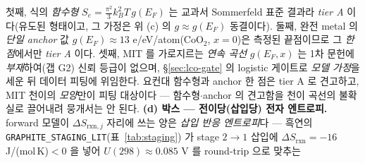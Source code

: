 \documentclass[11pt,a4paper]{article}
\newcommand{\rxn}{\mathrm{rxn}}
\newcommand{\code}[1]{\texttt{#1}}
\begin{document}
첫째, 식의 \emph{함수형} $S_e=\tfrac{\pi^2}{3}k_B^2T\,g(E_F)$ 는 교과서 Sommerfeld 표준 결과라 \emph{tier A} 이다(유도된
형태이고, 그 가정은 위 (c) 의 $g\!\approx\!g(E_F)$ 동결이다). 둘째, 완전 metal 의 \emph{단일 anchor} 값
$g(E_F)\!\approx\!13$ e/eV/atom($\mathrm{CoO_2}$, $x{=}0$)은 측정된 끝점이므로 그 \emph{한 점}에서만 \emph{tier A}
이다\cite{motohashi2009}. 셋째, MIT 를 가로지르는 \emph{연속 곡선} $g(E_F,x)$ 는 1차 문헌에 \emph{부재}하여(갭 G2)
신뢰 등급이 없으며, \S\ref{sec:lco-gate} 의 logistic 게이트로 \emph{모델 가정}을 세운 뒤 데이터 피팅에 위임한다.
요컨대 함수형과 anchor 한 점은 tier A 로 견고하고, MIT 천이의 \emph{모양}만이 피팅 대상이다 — 함수형$\cdot$anchor 의
견고함을 천이 곡선의 불확실로 끌어내려 뭉개서는 안 된다. \textbf{(d) 박스 — 전이당(삽입당) 전자 엔트로피.} forward 모델이
$\Delta S_{\rxn,j}$ 자리에 쓰는 양은 \emph{삽입 반응 엔트로피}다 — 흑연의 \code{GRAPHITE\_STAGING\_LIT}(표~\ref{tab:staging})
가 stage $2\!\to\!1$ 삽입에 $\Delta S_\rxn=-16$ J/(mol\,K)$<0$ 을 넣어 $U(298)\approx0.085$ V 를 round-trip 으로 맞추는
\end{document}
